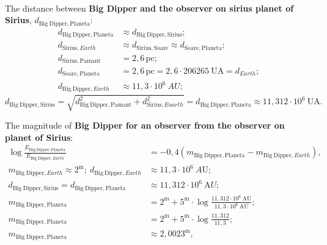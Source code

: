 \begin{description}
\begin{align*}
  \end{align*}
\item[f)] The distance between \textbf{Big Dipper and the observer on sirius
  planet of Sirius}, %
  $d_{\mathrm{Big\ Dipper,Planeta}}$:
  \begin{align*}
  d_{\mathrm{Big\ Dipper,Planeta}}
    &\approx d_{\mathrm{Big\ Dipper,Sirius}};\\
  d_{\mathrm{Sirius},Earth} &\approx d_{\mathrm{Sirius,Soare}}
    \approx d_{\mathrm{Soare,Planeta}};\\
  d_{\mathrm{Sirius,Pamant}} &= 2{,}6\,\mathrm{pc};\\
  d_{\mathrm{Soare,Planeta}} &= 2{,}6\,\mathrm{pc}
    = 2{,}6\cdot206265\ \mathrm{UA} = d_{Earth};\\
  d_{\mathrm{Big\ Dipper},Earth} &\approx 11{,}3\cdot10^{6}\ AU;
  \end{align*}
  \[ d_{\mathrm{Big\ Dipper,Sirius}}
     = \sqrt{d_{\mathrm{Big\ Dipper,Pamant}}^2
       + d_{\mathrm{Sirius},Eaarth}^2} %
     = d_{\mathrm{Big\ Dipper,Planeta}}
     \approx 11{,}312\cdot10^{6}\ \mathrm{UA}. \]
\item[g)] The magnitude of \textbf{Big Dipper for an observer from the
  observer on planet of Sirius}: %
  \begin{align*}
  \log\frac{E_{\mathrm{Big\ Dipper,Planeta}}}
           {E_{\mathrm{Big\ Dipper},Earth}}
    &= -0{,}4\left(m_{\mathrm{Big\ Dipper,Planeta}}
       - m_{\mathrm{Big\ Dipper},Earth}\right),\\
  m_{\mathrm{Big\ Dipper},Earth} \approx 2^{\mathrm{m}};\
  d_{\mathrm{Big\ Dipper},Earth} &\approx 11{,}3\cdot10^{6}\ A\mathrm{U};\\
  d_{\mathrm{Big\ Dipper,Sirius}} = d_{\mathrm{Big\ Dipper,Planeta}}
    &\approx 11{,}312\cdot10^{6}\ \mathrm{A}U;\\
  m_{\mathrm{Big\ Dipper,Planeta}}
    &= 2^{\mathrm{m}} + 5^{\mathrm{m}}\cdot
       \log\frac{11{,}312\cdot10^{6}\ \mathrm{AU}}
                {11{,}3\cdot10^{6}\ \mathrm{AU}};\\
  m_{\mathrm{Big\ Dipper,Planeta}}
    &= 2^{\mathrm{m}} + 5^{\mathrm{m}}\cdot
       \log\frac{11{,}312}{11{,}3};\\
  m_{\mathrm{Big\ Dipper,Planeta}} &\approx 2{,}0023^{\mathrm{m}},
  \end{align*}
\end{description}
